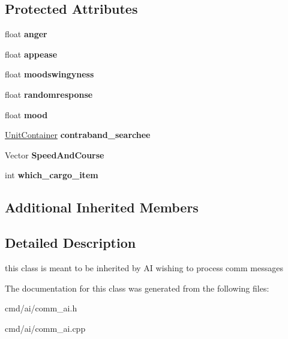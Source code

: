 \subsection*{Protected Attributes}
\begin{DoxyCompactItemize}
\item 
float {\bfseries anger}\hypertarget{classCommunicatingAI_a220ef78b4638ff74acbe507bd4bfd1fb}{}\label{classCommunicatingAI_a220ef78b4638ff74acbe507bd4bfd1fb}

\item 
float {\bfseries appease}\hypertarget{classCommunicatingAI_a337b4a770f2e7d86d24a6b6db91e2549}{}\label{classCommunicatingAI_a337b4a770f2e7d86d24a6b6db91e2549}

\item 
float {\bfseries moodswingyness}\hypertarget{classCommunicatingAI_a6432f4be8f6a48d91f98c6e2e8e386c9}{}\label{classCommunicatingAI_a6432f4be8f6a48d91f98c6e2e8e386c9}

\item 
float {\bfseries randomresponse}\hypertarget{classCommunicatingAI_a0f6a920089f33aff6baa86ba6c918e2b}{}\label{classCommunicatingAI_a0f6a920089f33aff6baa86ba6c918e2b}

\item 
float {\bfseries mood}\hypertarget{classCommunicatingAI_afbdaac5f1c8dfbab42ae341f23a3a0c6}{}\label{classCommunicatingAI_afbdaac5f1c8dfbab42ae341f23a3a0c6}

\item 
\hyperlink{classUnitContainer}{Unit\+Container} {\bfseries contraband\+\_\+searchee}\hypertarget{classCommunicatingAI_a575b973313f8c5d42b5778bd2261e26b}{}\label{classCommunicatingAI_a575b973313f8c5d42b5778bd2261e26b}

\item 
Vector {\bfseries Speed\+And\+Course}\hypertarget{classCommunicatingAI_ac27ed566fc73efd1aaec475d2d645f3c}{}\label{classCommunicatingAI_ac27ed566fc73efd1aaec475d2d645f3c}

\item 
int {\bfseries which\+\_\+cargo\+\_\+item}\hypertarget{classCommunicatingAI_a2188f196508c0d32d604ca38b470cc57}{}\label{classCommunicatingAI_a2188f196508c0d32d604ca38b470cc57}

\end{DoxyCompactItemize}
\subsection*{Additional Inherited Members}


\subsection{Detailed Description}
this class is meant to be inherited by AI wishing to process comm messages 

The documentation for this class was generated from the following files\+:\begin{DoxyCompactItemize}
\item 
cmd/ai/comm\+\_\+ai.\+h\item 
cmd/ai/comm\+\_\+ai.\+cpp\end{DoxyCompactItemize}
